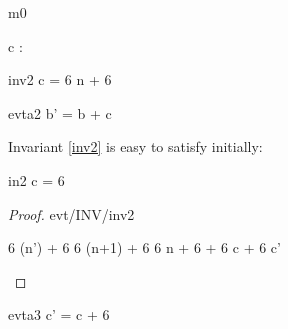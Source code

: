 \documentclass[12pt]{amsart}
\begin{document}
\begin{machine}{m0}
\begin{variable}
	c : \Int
\end{variable}

\begin{invariant}{inv2}
	c = 6 \cdot n + 6
\end{invariant}

\begin{evassignment}{evt}{a2}
	b' = b + c
\end{evassignment}

Invariant \ref{inv2} is easy to satisfy initially:

\begin{initialization}{in2}
	c = 6
\end{initialization}

\begin{proof}{evt/INV/inv2}
	\begin{calculation}
		6 \cdot (n') + 6
	\hint{=}{ \ref{a0} }
		6 \cdot (n+1) + 6
		6 \cdot n + 6 + 6
	\hint{=}{ \ref{inv2} }
		c + 6
	\hint{=}{ \ref{a3} }
		c'
	\end{calculation}
\end{proof}
%
\begin{evassignment}{evt}{a3}
	c' = c + 6
\end{evassignment}

\end{machine}
\end{document}
